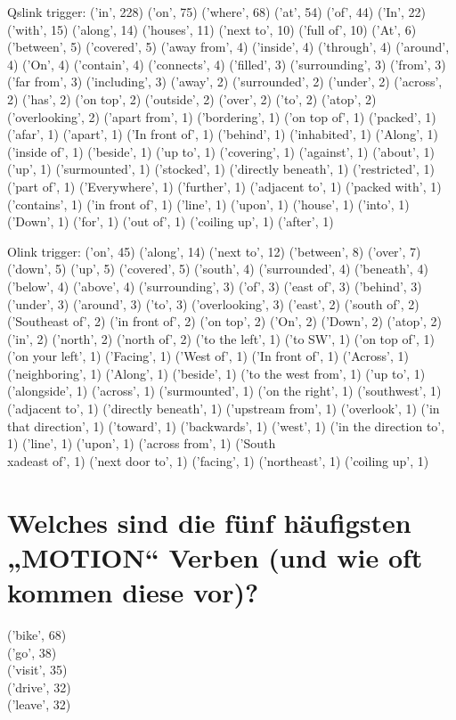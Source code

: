 \documentclass[12pt,fleqn]{article}
\begin{document}
Qslink trigger:
('in', 228)
('on', 75)
('where', 68)
('at', 54)
('of', 44)
('In', 22)
('with', 15)
('along', 14)
('houses', 11)
('next to', 10)
('full of', 10)
('At', 6)
('between', 5)
('covered', 5)
('away from', 4)
('inside', 4)
('through', 4)
('around', 4)
('On', 4)
('contain', 4)
('connects', 4)
('filled', 3)
('surrounding', 3)
('from', 3)
('far from', 3)
('including', 3)
('away', 2)
('surrounded', 2)
('under', 2)
('across', 2)
('has', 2)
('on top', 2)
('outside', 2)
('over', 2)
('to', 2)
('atop', 2)
('overlooking', 2)
('apart from', 1)
('bordering', 1)
('on top of', 1)
('packed', 1)
('afar', 1)
('apart', 1)
('In front of', 1)
('behind', 1)
('inhabited', 1)
('Along', 1)
('inside of', 1)
('beside', 1)
('up to', 1)
('covering', 1)
('against', 1)
('about', 1)
('up', 1)
('surmounted', 1)
('stocked', 1)
('directly beneath', 1)
('restricted', 1)
('part         of', 1)
('Everywhere', 1)
('further', 1)
('adjacent to', 1)
('packed with', 1)
('contains', 1)
('in front of', 1)
('line', 1)
('upon', 1)
('house', 1)
('into', 1)
('Down', 1)
('for', 1)
('out of', 1)
('coiling up', 1)
('after', 1)

Olink trigger:
('on', 45)
('along', 14)
('next to', 12)
('between', 8)
('over', 7)
('down', 5)
('up', 5)
('covered', 5)
('south', 4)
('surrounded', 4)
('beneath', 4)
('below', 4)
('above', 4)
('surrounding', 3)
('of', 3)
('east of', 3)
('behind', 3)
('under', 3)
('around', 3)
('to', 3)
('overlooking', 3)
('east', 2)
('south of', 2)
('Southeast of', 2)
('in front of', 2)
('on top', 2)
('On', 2)
('Down', 2)
('atop', 2)
('in', 2)
('north', 2)
('north of', 2)
('to the left', 1)
('to SW', 1)
('on top of', 1)
('on your left', 1)
('Facing', 1)
('West of', 1)
('In front of', 1)
('Across', 1)
('neighboring', 1)
('Along', 1)
('beside', 1)
('to the west from', 1)
('up to', 1)
('alongside', 1)
('across', 1)
('surmounted', 1)
('on the right', 1)
('southwest', 1)
('adjacent to', 1)
('directly beneath', 1)
('upstream from', 1)
('overlook', 1)
('in that direction', 1)
('toward', 1)
('backwards', 1)
('west', 1)
('in the direction to', 1)
('line', 1)
('upon', 1)
('across from', 1)
('South\\xadeast of', 1)
('next door to', 1)
('facing', 1)
('northeast', 1)
('coiling up', 1) 

\section*{Welches sind die fünf häufigsten „MOTION“ Verben (und wie oft kommen diese vor)?}

('bike', 68)	\\
('go', 38)		\\
('visit', 35)  \\
('drive', 32)  \\
('leave', 32)  \\
\end{document}
